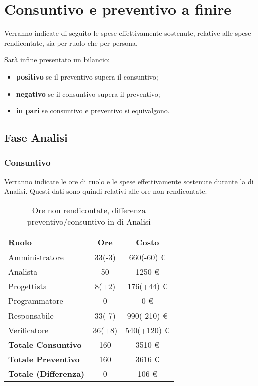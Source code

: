 \section{Consuntivo e preventivo a finire}
Verranno indicate di seguito le spese effettivamente sostenute, relative alle spese rendicontate, sia per ruolo che per persona.

Sar\`a infine presentato un bilancio:
\begin{itemize}
\item \textbf{positivo} se il preventivo supera il consuntivo;
\item \textbf{negativo} se il consuntivo supera il preventivo;
\item \textbf{in pari} se consuntivo e preventivo si equivalgono.
\end{itemize}


\subsection{Fase Analisi}
\subsubsection{Consuntivo}
Verranno indicate le ore di ruolo e le spese effettivamente sostenute durante la  di Analisi. Questi dati sono quindi relativi alle ore non rendicontate.

\begin{table}[H]
	\centering
	\begin{tabular}{ l c c }
		\textbf{Ruolo} & \textbf{Ore} & \textbf{Costo} \\
		\hline
		Amministratore & 33(-3) & 660(-60) \euro{} \\
		Analista & 50 & 1250 \euro{} \\
		Progettista & 8(+2) & 176(+44) \euro{} \\
		Programmatore & 0 & 0 \euro{} \\
		Responsabile & 33(-7) & 990(-210) \euro{} \\
		Verificatore & 36(+8) & 540(+120) \euro{} \\
		\hline
		\textbf{Totale Consuntivo} & 160 & 3510 \euro{} \\
		\hline
		\textbf{Totale Preventivo} & 160 & 3616 \euro{} \\
		\hline
		\textbf{Totale (Differenza)} & 0 & 106 \euro{} \\
		\hline
	\end{tabular}
	\caption{Ore non rendicontate, differenza preventivo/consuntivo in  di Analisi}
\end{table}



